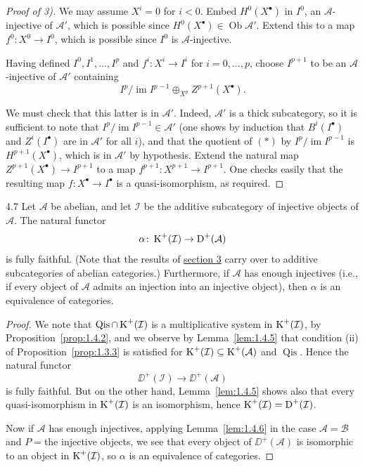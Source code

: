 \begin{proof}[Proof of 3)]
We may assume $X^i=0$ for $i<0$. Embed $H^0(X^\bullet)$ in $I^0$, an $\mathcal{A}$-injective of $\mathcal{A}'$, which is possible since $H^0(X^\bullet)\in\operatorname{Ob}\mathcal{A}'$. Extend this to a map $f^0\colon X^0\to I^0$, which is possible since $I^0$ is $\mathcal{A}$-injective.

Having defined $I^0,I^1,\dots,I^p$ and $f^i\colon X^i\to I^i$ for $i=0,\dots,p$, choose $I^{p+1}$ to be an $\mathcal{A}$-injective of $\mathcal{A}'$ containing
\[
I^p\big/\operatorname{im}I^{p-1} \oplus_{X^p} Z^{p+1}(X^\bullet). \tag{*}
\]

We must check that this latter is in $\mathcal{A}'$. Indeed, $\mathcal{A}'$ is a thick subcategory, so it is sufficient to note that $I^p/\operatorname{im}I^{p-1}\in\mathcal{A}'$ (one shows by induction that $B^i(I^\bullet)$ and $Z^i(I^\bullet)$ are in $\mathcal{A}'$ for all $i$), and that the quotient of $(*)$ by $I^p/\operatorname{im}I^{p-1}$ is $H^{p+1}(X^\bullet)$, which is in $\mathcal{A}'$ by hypothesis. Extend the natural map $Z^{p+1}(X^\bullet)\to I^{p+1}$ to a map $f^{p+1}\colon X^{p+1}\to I^{p+1}$. One checks easily that the resulting map $f\colon X^\bullet\to I^\bullet$ is a quasi-isomorphism, as required.
\end{proof}

\begin{bookproposition}{4.7}\label{prop:1.4.7}
Let $\mathcal{A}$ be abelian, and let $\mathcal{I}$ be the additive subcategory of injective objects of $\mathcal{A}$. The natural functor
\[
\alpha\colon \operatorname{K}^+(\mathcal{I})\to \operatorname{D}^+(\mathcal{A})
\]
is fully faithful. (Note that the results of \hyperref[sec:1.3]{section 3} carry over to additive subcategories of abelian categories.) Furthermore, if $\mathcal{A}$ has enough injectives (i.e., if every object of $\mathcal{A}$ admits an injection into an injective object), then $\alpha$ is an equivalence of categories.
\end{bookproposition}

\begin{proof}
We note that $\operatorname{Qis}\cap\operatorname{K}^+(\mathcal{I})$ is a multiplicative system in $\operatorname{K}^+(\mathcal{I})$, by Proposition~\ref{prop:1.4.2}, and we observe by Lemma~\ref{lem:1.4.5} that condition (ii) of Proposition~\ref{prop:1.3.3} is satisfied for $\operatorname{K}^+(\mathcal{I})\subseteq\operatorname{K}^+(\mathcal{A})$ and $\operatorname{Qis}$. Hence the natural functor
\[
\DD^+(\mathcal{I}) \longrightarrow \DD^+(\mathcal{A})
\]
is fully faithful. But on the other hand, Lemma~\ref{lem:1.4.5} shows also that every quasi-isomorphism in $\operatorname{K}^+(\mathcal{I})$ is an isomorphism, hence $\operatorname{K}^+(\mathcal{I}) = \operatorname{D}^+(\mathcal{I})$.

Now if $\mathcal{A}$ has enough injectives, applying Lemma~\ref{lem:1.4.6} in the case $\mathcal{A}=\mathcal{B}$ and $P = {}$the injective objects, we see that every object of $\DD^+(\mathcal{A})$ is isomorphic to an object in $\operatorname{K}^+(\mathcal{I})$, so $\alpha$ is an equivalence of categories.
\end{proof}

